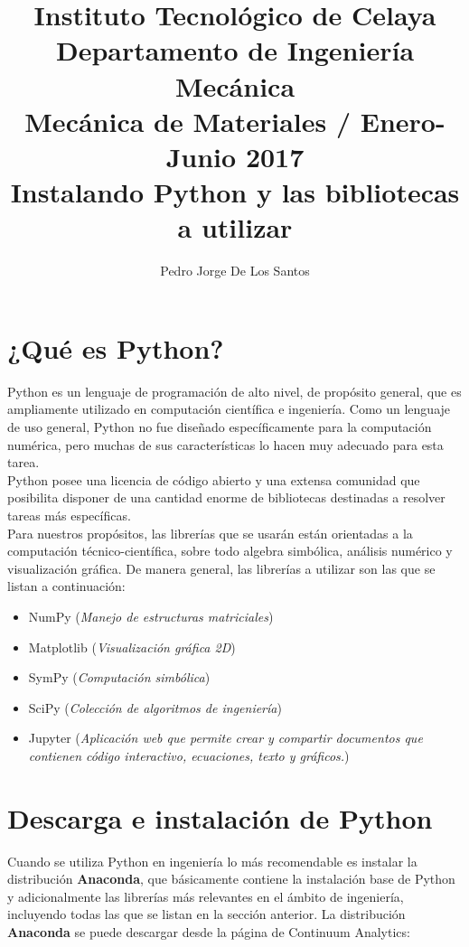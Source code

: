 \documentclass[12pt,letterpaper]{article}
\author{{\small Pedro Jorge De Los Santos}}
\title{
\vspace{-20mm}
{\normalsize Instituto Tecnológico de Celaya}\\[-2mm]
{\normalsize Departamento de Ingeniería Mecánica}\\[-2mm]
{\normalsize Mecánica de Materiales / Enero-Junio 2017} \\[-2mm]
{\normalsize\bfseries Instalando Python y las bibliotecas a utilizar}
}
\date{}
\begin{document}
\maketitle

\section{¿Qué es Python?}

Python es un lenguaje de programación de alto nivel, de propósito general, que es ampliamente utilizado en computación científica e ingeniería. Como un lenguaje de uso general, Python no fue diseñado específicamente para la computación numérica, pero muchas de sus características lo hacen muy adecuado para esta tarea. \\

Python posee una licencia de código abierto y una extensa comunidad que posibilita disponer de una cantidad enorme de bibliotecas destinadas 
a resolver tareas más específicas. \\

Para nuestros propósitos, las librerías que se usarán están orientadas a la computación técnico-científica, sobre todo algebra simbólica, análisis numérico y 
visualización gráfica. De manera general, las librerías a utilizar son las que se listan a continuación:

\begin{itemize}
\item NumPy (\textit{Manejo de estructuras matriciales})
\item Matplotlib (\textit{Visualización gráfica 2D})
\item SymPy (\textit{Computación simbólica})
\item SciPy (\textit{Colección de algoritmos de ingeniería})
\item Jupyter (\textit{Aplicación web que permite crear y compartir documentos que contienen código interactivo, ecuaciones, texto y gráficos.})
\end{itemize}


\section{Descarga e instalación de Python}

Cuando se utiliza Python en ingeniería lo más recomendable es instalar la distribución \textbf{Anaconda}, que básicamente contiene la instalación base 
de Python y adicionalmente las librerías más relevantes en el ámbito de ingeniería, incluyendo todas las que se listan en la sección anterior. La 
distribución \textbf{Anaconda} se puede descargar desde la página de Continuum Analytics: \\
\end{document}
